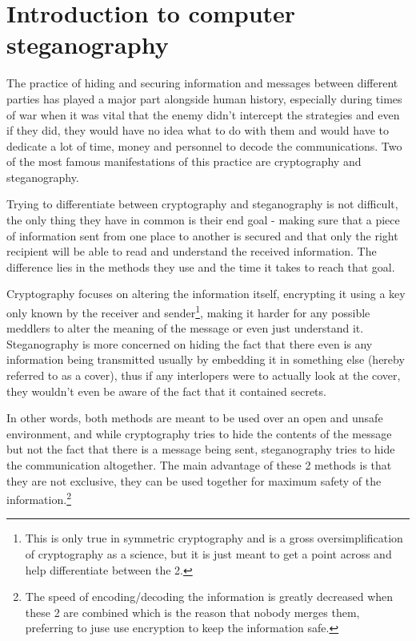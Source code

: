 
\chapter{Introduction to computer steganography}

The practice of hiding and securing information and messages between different parties has played a major part alongside human history, especially during times of war when it was vital that the enemy didn't intercept the strategies and even if they did, they would have no idea what to do with them and would have to dedicate a lot of time, money and personnel to decode the communications. Two of the most famous manifestations of this practice are cryptography and steganography\cite{steganography-history}.

Trying to differentiate between cryptography and steganography is not difficult, the only thing they have in common is their end goal - making sure that a piece of information sent from one place to another is secured and that only the right recipient will be able to read and understand the received information. The difference lies in the methods they use and the time it takes to reach that goal.

Cryptography focuses on altering the information itself, encrypting it using a key only known by the receiver and sender\footnote{This is only true in symmetric cryptography and is a gross oversimplification of cryptography as a science, but it is just meant to get a point across and help differentiate between the 2.}, making it harder for any possible meddlers to  alter the meaning of the message or even just understand it. Steganography is more concerned on hiding the fact that there even is any information being transmitted usually by embedding it in something else (hereby referred to as a cover), thus if any interlopers were to actually look at the cover, they wouldn't even be aware of the fact that it contained secrets.

In other words, both methods are meant to be used over an open and unsafe environment, and while cryptography tries to hide the contents of the message but not the fact that there is a message being sent, steganography tries to hide the communication altogether. The main advantage of these 2 methods is that they are not exclusive, they can be used together for maximum safety of the information.\footnote{The speed of encoding/decoding the information is greatly decreased when these 2 are combined which is the reason that nobody merges them, preferring to juse use encryption to keep the information safe.}

